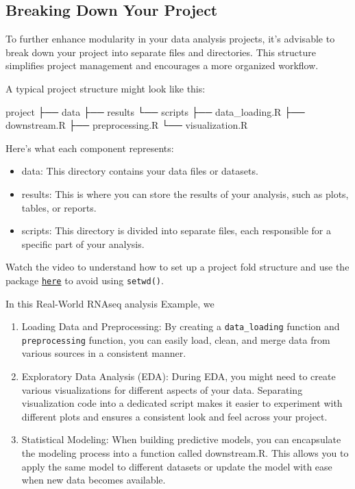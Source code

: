 \documentclass[
]{book}
\newenvironment{Shaded}{\begin{snugshade}}{\end{snugshade}}
\newcommand{\ExtensionTok}[1]{#1}
\newcommand{\NormalTok}[1]{#1}
\begin{document}
\hypertarget{breaking-down-your-project}{%
\subsection{Breaking Down Your Project}\label{breaking-down-your-project}}

To further enhance modularity in your data analysis projects, it's advisable to break down your project into separate files and directories. This structure simplifies project management and encourages a more organized workflow.

A typical project structure might look like this:

\begin{Shaded}
\begin{Highlighting}[]
\ExtensionTok{project}
\ExtensionTok{├──}\NormalTok{ data}
\ExtensionTok{├──}\NormalTok{ results}
\ExtensionTok{└──}\NormalTok{ scripts}
    \ExtensionTok{├──}\NormalTok{ data\_loading.R}
    \ExtensionTok{├──}\NormalTok{ downstream.R}
    \ExtensionTok{├──}\NormalTok{ preprocessing.R}
    \ExtensionTok{└──}\NormalTok{ visualization.R}
\end{Highlighting}
\end{Shaded}

Here's what each component represents:

\begin{itemize}
\item
  data: This directory contains your data files or datasets.
\item
  results: This is where you can store the results of your analysis, such as plots, tables, or reports.
\item
  scripts: This directory is divided into separate files, each responsible for a specific part of your analysis.
\end{itemize}

Watch the video to understand how to set up a project fold structure and use
the package \href{https://github.com/jennybc/here_here}{\texttt{here}} to avoid using \texttt{setwd()}.

In this Real-World RNAseq analysis Example, we

\begin{enumerate}
\def\labelenumi{\arabic{enumi}.}
\item
  Loading Data and Preprocessing: By creating a \texttt{data\_loading} function and \texttt{preprocessing} function, you can easily load, clean, and merge data from various sources in a consistent manner.
\item
  Exploratory Data Analysis (EDA): During EDA, you might need to create various visualizations for different aspects of your data. Separating visualization code into a dedicated script makes it easier to experiment with different plots and ensures a consistent look and feel across your project.
\item
  Statistical Modeling: When building predictive models, you can encapsulate the modeling process into a function called downstream.R. This allows you to apply the same model to different datasets or update the model with ease when new data becomes available.
\end{enumerate}
\end{document}
